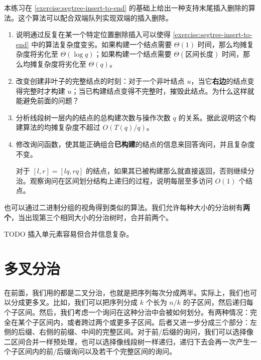\begin{exercise}[分治树的末尾插入删除]
    本练习在 \cref{exercise:segtree-insert-to-end} 的基础上给出一种支持末尾插入删除的算法。这个算法可以配合双端队列实现双端的插入删除。

    \begin{enumerate}
        \item 说明通过反复在某一个特定位置删除插入可以使得 \cref{exercise:segtree-insert-to-end} 中的算法复杂度变劣。如果构建一个结点需要 $\Theta(1)$ 时间，那么均摊复杂度将劣化至 $\Theta(\log q)$；如果构建一个结点需要 $\Theta(\text{区间长度})$ 时间，那么均摊复杂度将劣化至 $\Theta(q)$。
        \item 改变创建非叶子的完整结点的时刻：对于一个非叶结点 $u$，当它\textbf{右边}的结点变得完整时才构建 $u$；当已构建结点变得不完整时，摧毁此结点。为什么这样就能避免前面的问题？
        \item 分析线段树一层内的结点的总构建次数与操作次数 $q$ 的关系。据此说明这个构建算法的均摊复杂度不超过 $O(T(q)/q)$。
        \item 修改询问函数，使其能正确组合\textbf{已构建}的结点的信息来回答询问，并且复杂度不变。\begin{hint}
            对于 $[l,r]=[lq,rq]$ 的结点，如果其已被构建那么就直接返回，否则继续分治。观察询问在区间划分结构上递归的过程，说明每层至多访问 $O(1)$ 个结点。
        \end{hint}
    \end{enumerate}
\end{exercise}
\begin{remark}
    也可以通过二进制分组的视角得到类似的算法。我们允许每种大小的分治树有\textbf{两个}，当出现第三个相同大小的分治树时，合并前两个。
\end{remark}

\begin{remark}
    TODO 插入单元素容易但合并信息复杂。
\end{remark}

\section{多叉分治}

在前面，我们用的都是二叉分治，也就是把序列每次分成两半。实际上，我们也可以分成更多叉。比如，我们可以把序列分成 $k$ 个长为 $n/k$ 的子区间，然后递归每个子区间。然后，我们考虑一个询问在这种分治中会被如何划分。有两种情况：完全在某个子区间内，或者跨过两个或更多子区间。后者又进一步分成三个部分：左侧的后缀、右侧的前缀、中间的完整区间。对于前/后缀的询问，我们可以选择像二区间合并一样预处理，也可以选择像线段树一样递归，递归下去会再一次产生一个子区间内的前/后缀询问以及若干个完整区间的询问。


